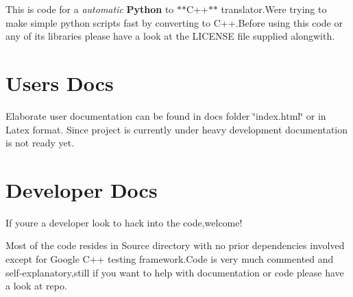 This is code for a {\itshape automatic} {\bfseries Python} to $\ast$$\ast$\+C++$\ast$$\ast$ translator.\+We\textquotesingle{}re trying to make simple python scripts fast by converting to C++.Before using this code or any of its libraries please have a look at the L\+I\+C\+E\+N\+SE file supplied alongwith.

\section*{Users Docs }

Elaborate user documentation can be found in docs folder \char`\"{}index.\+html\char`\"{} or in Latex format. Since project is currently under heavy development documentation is not ready yet.

\section*{Developer Docs }

If you\textquotesingle{}re a developer look to hack into the code,welcome!

Most of the code resides in Source directory with no prior dependencies involved except for Google C++ testing framework.\+Code is very much commented and self-\/explanatory,still if you want to help with documentation or code please have a look at repo. 